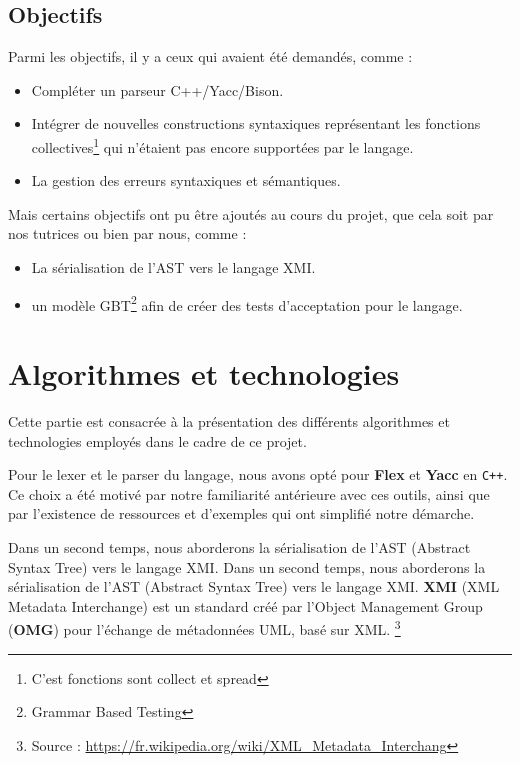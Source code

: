 \documentclass[a4paper, 11pt]{article}
\DeclareRobustCommand{\prog}[1]{\begingroup\urlstyle{tt}\nolinkurl{#1}\endgroup}
\newcommand{\kw}[1]{\textbf{#1}}
\begin{document}
\newpage
\subsection{Objectifs}

Parmi les objectifs, il y a ceux qui avaient été demandés, comme :
\begin{itemize}
    \item Compléter un parseur C++/Yacc/Bison.
    \item Intégrer de nouvelles constructions syntaxiques représentant les fonctions collectives\footnote{C'est fonctions sont collect et spread} qui n'étaient pas encore supportées par le langage.
    \item La gestion des erreurs syntaxiques et sémantiques.
\end{itemize} 


Mais certains objectifs ont pu être ajoutés au cours du projet, que cela soit par nos tutrices ou bien par nous, comme :
\begin{itemize}
    \item La sérialisation de l'AST vers le langage XMI.
    \item un modèle GBT\footnote{Grammar Based Testing} afin de créer des tests d'acceptation pour le langage.
\end{itemize}

\section{Algorithmes et technologies}
\label{sec:algorithmes_techno}

Cette partie est consacrée à la présentation des différents algorithmes et technologies employés dans le cadre de ce projet.

Pour le lexer et le parser du langage, nous avons opté pour \kw{Flex} et \kw{Yacc} en \prog{C++}. Ce choix a été motivé par notre familiarité antérieure avec ces outils, ainsi que par l'existence de ressources et d'exemples qui ont simplifié notre démarche.

Dans un second temps, nous aborderons la sérialisation de l'AST (Abstract Syntax Tree) vers le langage XMI. Dans un second temps, nous aborderons la sérialisation de l'AST (Abstract Syntax Tree) vers le langage XMI. \kw{XMI} (XML Metadata Interchange) est un standard créé par l'Object Management Group (\kw{OMG}) pour l'échange de métadonnées UML, basé sur XML. \footnote{Source : \url{https://fr.wikipedia.org/wiki/XML_Metadata_Interchang}}
\end{document}
